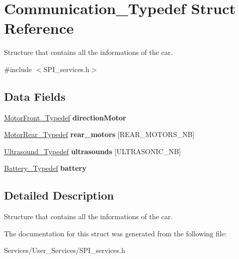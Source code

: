 \hypertarget{struct_communication___typedef}{}\section{Communication\+\_\+\+Typedef Struct Reference}
\label{struct_communication___typedef}


Structure that contains all the informations of the car.  




{\ttfamily \#include $<$S\+P\+I\+\_\+services.\+h$>$}

\subsection*{Data Fields}
\begin{DoxyCompactItemize}
\item 
\mbox{\label{struct_communication___typedef_a3a8290e3b46dab6047435b592b81efdc}} 
\hyperlink{struct_motor_front___typedef}{Motor\+Front\+\_\+\+Typedef} {\bfseries direction\+Motor}
\item 
\mbox{\label{struct_communication___typedef_a718b0adfdc43ccf0d67399e1583ac599}} 
\hyperlink{struct_motor_rear___typedef}{Motor\+Rear\+\_\+\+Typedef} {\bfseries rear\+\_\+motors} \mbox{[}R\+E\+A\+R\+\_\+\+M\+O\+T\+O\+R\+S\+\_\+\+NB\mbox{]}
\item 
\mbox{\label{struct_communication___typedef_a30835d9cdfc16faa82377c90fe401538}} 
\hyperlink{struct_ultrasound___typedef}{Ultrasound\+\_\+\+Typedef} {\bfseries ultrasounds} \mbox{[}U\+L\+T\+R\+A\+S\+O\+N\+I\+C\+\_\+\+NB\mbox{]}
\item 
\mbox{\label{struct_communication___typedef_ae3d4b0bc189b56df3a0e34afd8fe98b2}} 
\hyperlink{struct_battery___typedef}{Battery\+\_\+\+Typedef} {\bfseries battery}
\end{DoxyCompactItemize}


\subsection{Detailed Description}
Structure that contains all the informations of the car. 

The documentation for this struct was generated from the following file\+:\begin{DoxyCompactItemize}
\item 
Services/\+User\+\_\+\+Services/S\+P\+I\+\_\+services.\+h\end{DoxyCompactItemize}
